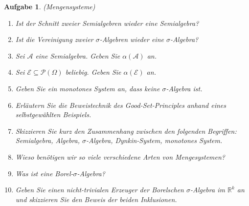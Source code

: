 \documentclass[11pt, a4paper, ngerman]{article}
\newcommand{\R}{\mathbb{R}}
\newtheorem{aufgabe}{Aufgabe}
\begin{document}
    
\begin{aufgabe} (Mengensysteme)
    \begin{enumerate}
        \item 
        Ist der Schnitt zweier Semialgebren wieder eine Semialgebra? 
        \item 
        Ist die Vereinigung zweier $\sigma$-Algebren wieder eine $\sigma$-Algebra? 
        \item 
        Sei $\mathcal{A}$ eine Semialgebra. Geben Sie $\alpha(\mathcal{A})$ an. 
        \item 
        Sei $\mathcal{E} \subseteq \mathcal{P}(\Omega)$ beliebig. Geben Sie $\alpha(\mathcal{E})$ an.
        \item 
        Geben Sie ein monotones System an, dass keine $\sigma$-Algebra ist. 
        \item 
        Erläutern Sie die Beweistechnik des Good-Set-Principles anhand eines selbstgewählten Beispiels.
        \item 
        Skizzieren Sie kurz den Zusammenhang zwischen den folgenden Begriffen: Semialgebra, Algebra, $\sigma$-Algebra, Dynkin-System, monotones System. 
        \item 
        Wieso benötigen wir so viele verschiedene Arten von Mengesystemen? 
        \item 
        Was ist eine Borel-$\sigma$-Algebra? 
        \item 
        Geben Sie einen nicht-trivialen Erzeuger der Borelschen $\sigma$-Algebra im $\R^k$ an und skizzieren Sie den Beweis der beiden Inklusionen. 
    \end{enumerate}
\end{aufgabe}
\end{document}
